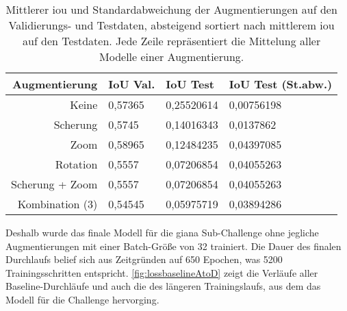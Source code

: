 \begin{table}
	\centering
	\setlength{\extrarowheight}{0pt}
	\addtolength{\extrarowheight}{\aboverulesep}
	\addtolength{\extrarowheight}{\belowrulesep}
	\setlength{\aboverulesep}{0pt}
	\setlength{\belowrulesep}{0pt}
	\caption[Mittlerer \gls{iou} und Standardabweichung der Augmentierungen auf den Validierungs- und Testdaten]{Mittlerer \gls{iou} und Standardabweichung der Augmentierungen auf den Validierungs- und Testdaten, absteigend sortiert nach mittlerem \gls{iou} auf den Testdaten. Jede Zeile repräsentiert die Mittelung aller Modelle einer Augmentierung.}
	\begin{tabular}{rlll}
		\toprule
		Augmentierung & IoU Val. & IoU Test & IoU Test (St.abw.) \\ 
		\midrule
		Keine & {\cellcolor[rgb]{0.612,0.816,0.529}}0,57365 & {\cellcolor[rgb]{0.388,0.745,0.482}}0,25520614 & {\cellcolor[rgb]{0.388,0.745,0.482}}0,00756198 \\
		Scherung & {\cellcolor[rgb]{0.6,0.812,0.529}}0,5745 & {\cellcolor[rgb]{0.749,0.859,0.561}}0,14016343 & {\cellcolor[rgb]{0.49,0.776,0.502}}0,0137862 \\
		Zoom & {\cellcolor[rgb]{0.388,0.745,0.482}}0,58965 & {\cellcolor[rgb]{0.8,0.875,0.573}}0,12484235 & {\cellcolor[rgb]{1,0.937,0.612}}0,04397085 \\
		Rotation & {\cellcolor[rgb]{0.859,0.894,0.584}}0,5557 & {\cellcolor[rgb]{0.965,0.925,0.604}}0,07206854 & {\cellcolor[rgb]{0.941,0.918,0.596}}0,04055263 \\
		Scherung + Zoom & {\cellcolor[rgb]{0.859,0.894,0.584}}0,5557 & {\cellcolor[rgb]{0.965,0.925,0.604}}0,07206854 & {\cellcolor[rgb]{0.941,0.918,0.596}}0,04055263 \\ %
		Kombination (3) & {\cellcolor[rgb]{1,0.937,0.612}}0,54545 & {\cellcolor[rgb]{1,0.937,0.612}}0,05975719 & {\cellcolor[rgb]{0.914,0.91,0.592}}0,03894286 \\
		\bottomrule
	\end{tabular}
\label{tab:aug}
\end{table}

Deshalb wurde das finale Modell für die \gls{giana} Sub-Challenge ohne jegliche Augmentierungen mit einer Batch-Größe von 32 trainiert.
Die Dauer des finalen Durchlaufs belief sich aus Zeitgründen auf 650 Epochen, was 5200 Trainingsschritten entspricht.
\autoref{fig:lossbaselineAtoD} zeigt die Verläufe aller Baseline-Durchläufe und auch die des längeren Trainingslaufs, aus dem das Modell für die Challenge hervorging.

